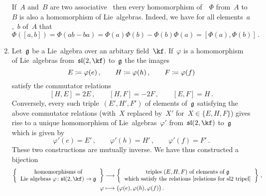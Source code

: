 \begin{examples}
\begin{enumerate}
      \label{algebra homomorphisms are lie algebra homomorphisms}
      If~$A$ and~$B$ are two associative~{\algebras{$\kf$}} then every homomorphism of~{\algebras{$\kf$}}~$\Phi$ from~$A$ to~$B$ is also a homomorphism of Lie~algebras.
      Indeed, we have for all elements~$a$,~$b$ of~$A$ that
      \[
        \Phi([a,b])
        =
        \Phi(ab - ba)
        =
        \Phi(a) \Phi(b) - \Phi(b) \Phi(a)
        =
        [\Phi(a), \Phi(b)] \,.
      \]
    \item
      Let~$\mathfrak{g}$ be a Lie~algebra over an arbitary field~$\kf$.
      If~$\varphi$ is a homomorphism of Lie~algebras from~$\sllie(2, \kf)$ to~$\mathfrak{g}$ the the images
      \[
        E \coloneqq \varphi(e)  \,,
        \qquad
        H \coloneqq \varphi(h)  \,,
        \qquad
        F \coloneqq \varphi(f)
      \]
      satisfy the commutator relations
      \begin{equation}
        \label{relations for sl2 tripel}
        [H, E] = 2E  \,,
        \qquad
        [H, F] = -2F  \,,
        \qquad
        [E, F] = H \,.
      \end{equation}
      Conversely, every such triple~$(E', H', F')$ of elements of~$\mathfrak{g}$ satisfying the above commutator relations (with~$X$ replaced by~$X'$ for~$X \in \{ E, H, F \}$) gives rise to a unique homomorphism of Lie~algebras~$\varphi'$ from~$\sllie(2, \kf)$ to~$\mathfrak{g}$ which is given by
      \[
        \varphi'(e) = E' \,,
        \qquad
        \varphi'(h) = H' \,,
        \qquad
        \varphi'(f) = F' \,.
      \] 
      These two constructions are mutually inverse.
      We have thus constructed a bijection
      \begin{align*}
        \left\{
          \begin{tabular}{c}
            homomorphisms of \\
            Lie~algebras~$\varphi \colon \sllie(2, \kf) \to \glie$
          \end{tabular}
        \right\}
        &\to
        \left\{
          \begin{tabular}{c}
            triples $(E, H, F)$ of elements of~$\glie$ \\
            which satisfy the relations~\eqref{relations for sl2 tripel}
          \end{tabular}
        \right\} \,,
        \\
        \varphi
        &\mapsto
        \bigl( \varphi(e), \varphi(h), \varphi(f) \bigr) \,.
      \end{align*}
  \end{enumerate}
\end{examples}


